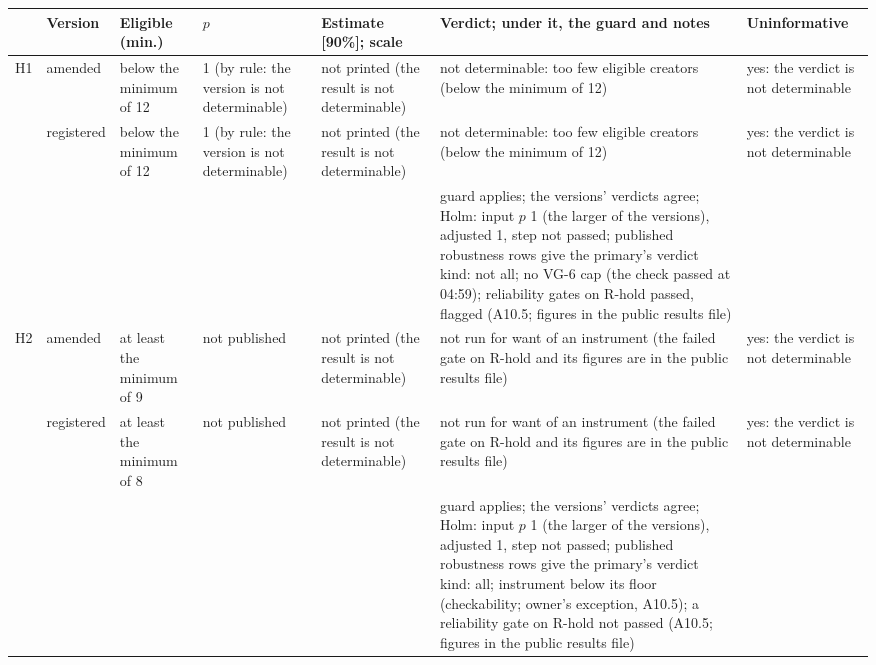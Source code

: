 {\tiny\setlength{\tabcolsep}{2pt}
\begin{tabular}{@{}p{}p{}p{}p{}p{}p{}p{}@{}}
\toprule
 & Version & Eligible (min.) & $p$ & Estimate [90\%]; scale & Verdict; under it, the guard and notes & Uninformative \\
\midrule
H1 & amended & below the minimum of 12 & 1 (by rule: the version is not determinable) & not printed (the result is not determinable) & not determinable: too few eligible creators (below the minimum of 12) & yes: the verdict is not determinable \\
 & registered & below the minimum of 12 & 1 (by rule: the version is not determinable) & not printed (the result is not determinable) & not determinable: too few eligible creators (below the minimum of 12) & yes: the verdict is not determinable \\
 &  &  &  &  & guard applies; the versions' verdicts agree; Holm: input $p$ 1 (the larger of the versions), adjusted 1, step not passed; published robustness rows give the primary's verdict kind: not all; no VG-6 cap (the check passed at 04:59); reliability gates on R-hold passed, flagged (A10.5; figures in the public results file) &  \\
\midrule
H2 & amended & at least the minimum of 9 & not published & not printed (the result is not determinable) & not run for want of an instrument (the failed gate on R-hold and its figures are in the public results file) & yes: the verdict is not determinable \\
 & registered & at least the minimum of 8 & not published & not printed (the result is not determinable) & not run for want of an instrument (the failed gate on R-hold and its figures are in the public results file) & yes: the verdict is not determinable \\
 &  &  &  &  & guard applies; the versions' verdicts agree; Holm: input $p$ 1 (the larger of the versions), adjusted 1, step not passed; published robustness rows give the primary's verdict kind: all; instrument below its floor (checkability; owner's exception, A10.5); a reliability gate on R-hold not passed (A10.5; figures in the public results file) &  \\

\end{tabular}}
